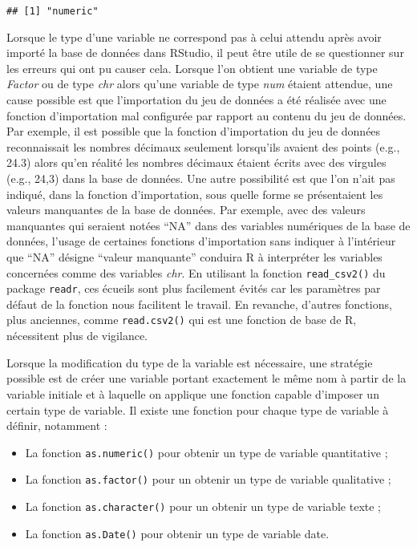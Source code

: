 \documentclass[
  french,
]{book}
\providecommand{\tightlist}{%
  \setlength{\itemsep}{0pt}\setlength{\parskip}{0pt}}
\begin{document}
\begin{verbatim}
## [1] "numeric"
\end{verbatim}

Lorsque le type d'une variable ne correspond pas à celui attendu après avoir importé la base de données dans RStudio, il peut être utile de se questionner sur les erreurs qui ont pu causer cela. Lorsque l'on obtient une variable de type \emph{Factor} ou de type \emph{chr} alors qu'une variable de type \emph{num} étaient attendue, une cause possible est que l'importation du jeu de données a été réalisée avec une fonction d'importation mal configurée par rapport au contenu du jeu de données. Par exemple, il est possible que la fonction d'importation du jeu de données reconnaissait les nombres décimaux seulement lorsqu'ils avaient des points (e.g., 24.3) alors qu'en réalité les nombres décimaux étaient écrits avec des virgules (e.g., 24,3) dans la base de données. Une autre possibilité est que l'on n'ait pas indiqué, dans la fonction d'importation, sous quelle forme se présentaient les valeurs manquantes de la base de données. Par exemple, avec des valeurs manquantes qui seraient notées ``NA'' dans des variables numériques de la base de données, l'usage de certaines fonctions d'importation sans indiquer à l'intérieur que ``NA'' désigne ``valeur manquante'' conduira R à interpréter les variables concernées comme des variables \emph{chr}. En utilisant la fonction \texttt{read\_csv2()} du package \texttt{readr}, ces écueils sont plus facilement évités car les paramètres par défaut de la fonction nous facilitent le travail. En revanche, d'autres fonctions, plus anciennes, comme \texttt{read.csv2()} qui est une fonction de base de R, nécessitent plus de vigilance.

Lorsque la modification du type de la variable est nécessaire, une stratégie possible est de créer une variable portant exactement le même nom à partir de la variable initiale et à laquelle on applique une fonction capable d'imposer un certain type de variable. Il existe une fonction pour chaque type de variable à définir, notamment :

\begin{itemize}
\tightlist
\item
  La fonction \texttt{as.numeric()} pour obtenir un type de variable quantitative ;
\item
  La fonction \texttt{as.factor()} pour un obtenir un type de variable qualitative ;
\item
  La fonction \texttt{as.character()} pour un obtenir un type de variable texte ;
\item
  La fonction \texttt{as.Date()} pour obtenir un type de variable date.
\end{itemize}
\end{document}
